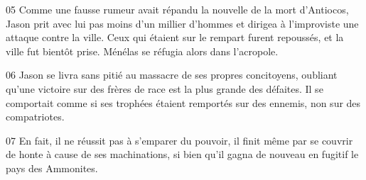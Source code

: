 
05 Comme une fausse rumeur avait répandu la nouvelle de la mort d’Antiocos, Jason prit avec lui pas moins d’un millier d’hommes et dirigea à l’improviste une attaque contre la ville. Ceux qui étaient sur le rempart furent repoussés, et la ville fut bientôt prise. Ménélas se réfugia alors dans l’acropole.

06 Jason se livra sans pitié au massacre de ses propres concitoyens, oubliant qu’une victoire sur des frères de race est la plus grande des défaites. Il se comportait comme si ses trophées étaient remportés sur des ennemis, non sur des compatriotes.

07 En fait, il ne réussit pas à s’emparer du pouvoir, il finit même par se couvrir de honte à cause de ses machinations, si bien qu’il gagna de nouveau en fugitif le pays des Ammonites.
